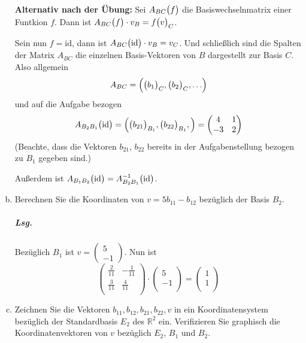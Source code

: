 \documentclass{scrreprt}
\begin{document}
\begin{enumerate}[(a)]
  \textbf{Alternativ nach der Übung:} Sei $A_{BC}\qty\big(f)$ die
  Basiswechselnmatrix einer Funtkion $f$.
  Dann ist $A_{BC}\qty\big(f) \cdot v_B = f\qty\big(v)_C$.

  Sein nun $f = \text{id}$, dann ist
  $A_{BC}\qty\big(\text{id}) \cdot v_B = v_C$.
  Und schließlich sind die Spalten der Matrix $A_{BC}$ die einzelnen Basis-Vektoren
  von $B$ dargestellt zur Basis $C$.
  Also allgemein
  \[
    A_{BC} = \qty\Big(\qty\big(b_1)_C, \qty\big(b_2)_C, \ldots)
  \]
  und auf die Aufgabe bezogen
  \[
    A_{B_2B_1}\qty\big(\text{id}) = \qty\Big(
    \qty\big(b_{21})_{B_1}, \qty\big(b_{22})_{B_1},
    ) = \begin{pmatrix}
      4  & 1 \\
      -3 & 2 \\
    \end{pmatrix}
  \]
  (Beachte, dass die Vektoren $b_{21}$, $b_{22}$ bereits in der Aufgabenstellung
  bezogen zu $B_1$ gegeben sind.)

  Außerdem ist
  $A_{B_1B_2}\qty\big(\text{id}) = A_{B_2B_1}^{-1}\qty\big(\text{id})$.

\newpage
\item Berechnen Sie die Koordinaten von $v = 5b_{11} - b_{12}$ bezüglich der
  Basis $B_2$.

  \subparagraph{Lsg.} Bezüglich $B_1$ ist
  $v = \begin{pmatrix} 5 \\ -1 \end{pmatrix}$.
  Nun ist
  \[
    \begin{pmatrix}
      \frac{2}{11} & -\frac{1}{11} \\
      \frac{3}{11} & \frac{4}{11}  \\
    \end{pmatrix} \cdot \begin{pmatrix}
      5  \\
      -1 \\
    \end{pmatrix} = \begin{pmatrix}
      1 \\
      1 \\
    \end{pmatrix}
  \]

\item Zeichnen Sie die Vektoren $b_{11}, b_{12}, b_{21}, b_{22}, v$ in ein
  Koordinatensystem bezüglich der Standardbasis $E_2$ des $\mathbb{R}^2$ ein.
  Verifizieren Sie graphisch die Koordinatenvektoren von $v$ bezüglich
  $E_2$, $B_1$ und $B_2$.


\end{enumerate}
\end{document}
